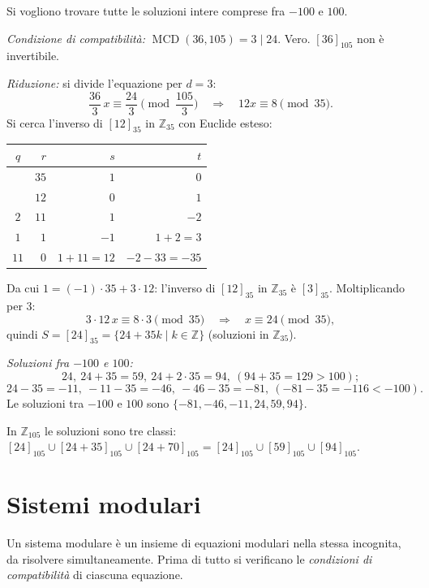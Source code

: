 \documentclass[11pt,a4paper]{article}
\begin{document}
\begin{esempio}
Si vogliono trovare tutte le soluzioni intere comprese fra $-100$ e $100$.

\emph{Condizione di compatibilità:} $\operatorname{MCD}(36, 105) = 3 \mid 24$. Vero. $[36]_{105}$ non è invertibile.

\emph{Riduzione:} si divide l'equazione per $d = 3$:
\[
  \frac{36}{3}\,x \equiv \frac{24}{3} \pmod{\frac{105}{3}} \quad\Rightarrow\quad 12x \equiv 8 \pmod{35}.
\]
Si cerca l'inverso di $[12]_{35}$ in $\mathbb{Z}_{35}$ con Euclide esteso:
\begin{center}
\begin{tabular}{c|r|r|r}
$q$ & $r$ & $s$ & $t$ \\
\midrule
 & $35$ & $1$ & $0$ \\
 & $12$ & $0$ & $1$ \\
$2$ & $11$ & $1$ & $-2$ \\
$1$ & $1$ & $-1$ & $1 + 2 = 3$ \\
$11$ & $0$ & $1 + 11 = 12$ & $-2 - 33 = -35$ \\
\end{tabular}
\end{center}
Da cui $1 = (-1)\cdot 35 + 3\cdot 12$: l'inverso di $[12]_{35}$ in $\mathbb{Z}_{35}$ è $[3]_{35}$. Moltiplicando per $3$:
\[
  3\cdot 12\,x \equiv 8\cdot 3 \pmod{35} \quad\Rightarrow\quad x \equiv 24 \pmod{35},
\]
quindi $S = [24]_{35} = \{24 + 35k \mid k \in \mathbb{Z}\}$ (soluzioni in $\mathbb{Z}_{35}$).

\emph{Soluzioni fra $-100$ e $100$:}
\[
  24,\ 24 + 35 = 59,\ 24 + 2\cdot 35 = 94,\ (94 + 35 = 129 > 100);
\]
\[
  24 - 35 = -11,\ -11 - 35 = -46,\ -46 - 35 = -81,\ (-81 - 35 = -116 < -100).
\]
Le soluzioni tra $-100$ e $100$ sono $\{-81, -46, -11, 24, 59, 94\}$.

In $\mathbb{Z}_{105}$ le soluzioni sono tre classi: $[24]_{105} \cup [24 + 35]_{105} \cup [24 + 70]_{105} = [24]_{105} \cup [59]_{105} \cup [94]_{105}$.
\end{esempio}

\section{Sistemi modulari}

Un sistema modulare è un insieme di equazioni modulari nella stessa incognita, da risolvere simultaneamente. Prima di tutto si verificano le \emph{condizioni di compatibilità} di ciascuna equazione.
\end{document}
